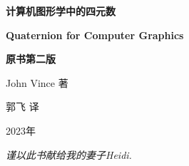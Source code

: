 \documentclass[10pt,b5paper,twoside]{book}
\theoremstyle{plain}
\begin{document}
\begin{CJK}{UTF8}{gkai}

	\setcounter{page}{0}
\begin{titlepage}
  \vspace*{1cm}
	\begin{center}
		{\Huge \textbf{计算机图形学中的四元数}\par}
		{\Large \textbf{Quaternion for Computer Graphics}\par}
		{\Large \textbf{原书第二版}\par}
  		\vspace*{1cm}
  		{\large\raggedleft John Vince  著\par}
  		{\large\raggedleft 郭飞  译\par}
  		
  		\vfill
  		{\Large 2023年\par}
	\end{center}
\end{titlepage} 

\thispagestyle{empty}
\mbox{}
\newpage
\thispagestyle{empty}
	\vspace*{5cm}
	\begin{center}
		\textit{谨以此书献给我的妻子Heidi.} 
	\end{center}
\newpage
\thispagestyle{empty}
\clearpage
\mbox{}
\end{CJK}
%



\end{document}
